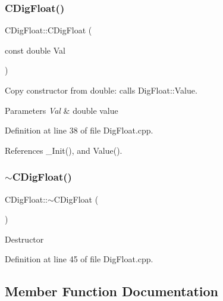 \subsubsection{\texorpdfstring{C\+Dig\+Float()}{CDigFloat()}\hspace{0.1cm}{\footnotesize\ttfamily [3/3]}}
{\footnotesize\ttfamily C\+Dig\+Float\+::\+C\+Dig\+Float (\begin{DoxyParamCaption}\item[{const double}]{Val }\end{DoxyParamCaption})}



Copy constructor from double\+: calls Dig\+Float\+::\+Value. 


\begin{DoxyParams}{Parameters}
{\em Val} & double value \\
\hline
\end{DoxyParams}


Definition at line 38 of file Dig\+Float.\+cpp.



References \+\_\+\+Init(), and Value().

\mbox{\label{classCDigFloat_adfee37b740660ebebcca8a088554e342}} 
\subsubsection{\texorpdfstring{$\sim$\+C\+Dig\+Float()}{~CDigFloat()}}
{\footnotesize\ttfamily C\+Dig\+Float\+::$\sim$\+C\+Dig\+Float (\begin{DoxyParamCaption}{ }\end{DoxyParamCaption})}

Destructor 

Definition at line 45 of file Dig\+Float.\+cpp.



\subsection{Member Function Documentation}
\mbox{\label{classCDigFloat_a89a0dda21c74c115ac41b432031666a6}} 
